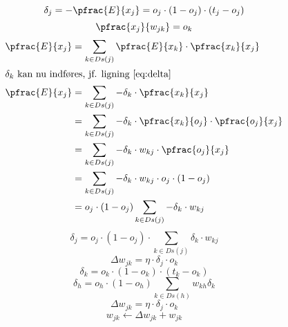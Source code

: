 \documentclass[../SOP.tex]{subfile}
\begin{document}
\begin{equation}
  \delta_j =-\pfrac{E}{x_j}=o_j\cdot(1-o_j)\cdot(t_j-o_j)
  \label{eq:delta}
\end{equation}
\begin{equation*}
  \pfrac{x_j}{w_{jk}}=o_k
\end{equation*}
\begin{align*}
  \pfrac{E}{x_j}&=\sum_{k\in Ds(j)} \pfrac{E}{x_k}\cdot \pfrac{x_k}{x_j}\\
  \intertext{$\delta_k$ kan nu indføres, jf. ligning \ref{eq:delta}}
  \pfrac{E}{x_j}&=\sum_{k\in Ds(j)} -\delta_k\cdot \pfrac{x_k}{x_j}\\
  &= \sum_{k\in Ds(j)} -\delta_k \cdot \pfrac{x_k}{o_j}\cdot\pfrac{o_j}{x_j}\\
  &= \sum_{k\in Ds(j)} -\delta_k \cdot w_{kj}\cdot \pfrac{o_j}{x_j}\\
  &= \sum_{k\in Ds(j)} -\delta_k \cdot w_{kj}\cdot o_j\cdot(1-o_j)\\
  &= o_j\cdot(1-o_j)\sum_{k\in Ds(j)} -\delta_k \cdot w_{kj}
\end{align*}
\begin{equation}
  \delta_j=o_j\cdot(1-o_j)\cdot\sum_{k\in Ds(j)} \delta_k\cdot w_{kj} 
  \label{eq:delta_h}
\end{equation}
\begin{equation}
  \Delta w_{jk}=\eta\cdot \delta_j\cdot o_{k}
  \label{eq:wchange}
\end{equation}
      \begin{equation*}
        \delta_k = o_k\cdot (1-o_k)\cdot(t_k-o_k)
      \end{equation*}
      \begin{equation*}
        \delta_h = o_h\cdot(1-o_h) \sum_{k\in Ds(h)} w_{kh}\delta_k
      \end{equation*}
      \begin{equation*}
        \Delta w_{jk} = \eta\cdot\delta_j\cdot o_k
      \end{equation*}
      \begin{equation*}
        w_{jk} \leftarrow \Delta w_{jk} + w_{jk}
      \end{equation*}
      
\end{document}
